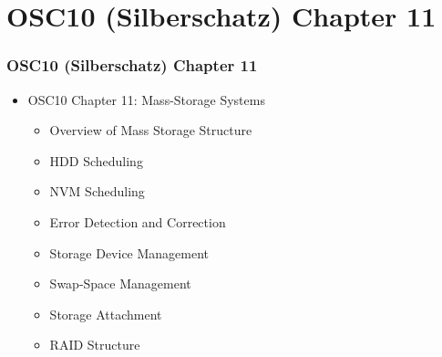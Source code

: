 \documentclass[aspectratio=169, xcolor=table, notheorems, hyperref={pdfpagelabels=false}]{beamer}
\begin{document}
\section{OSC10 (Silberschatz) Chapter 11}
\begin{frame}
\frametitle{OSC10 (Silberschatz) Chapter 11}
  \begin{itemize}
  \item OSC10 Chapter 11: Mass-Storage Systems
  \begin{itemize}
  \item Overview of Mass Storage Structure
  \item HDD Scheduling
  \item NVM Scheduling
  \item Error Detection and Correction
  \item Storage Device Management
  \item Swap-Space Management
  \item Storage Attachment
  \item RAID Structure
  \end{itemize}
  \end{itemize}
  \vfill \null
\end{frame}

\end{document}
